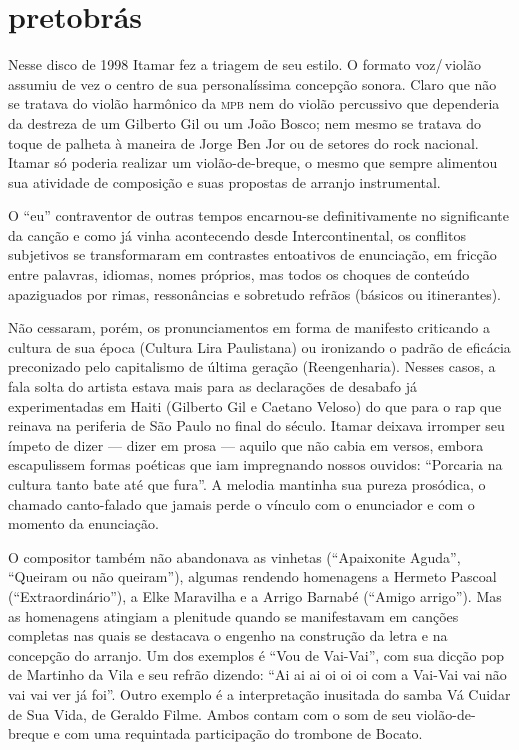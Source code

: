 \section{pretobrás}

Nesse disco de 1998 Itamar fez a triagem de seu estilo. O formato
voz/\,violão assumiu de vez o centro de sua personalíssima concepção
sonora. Claro que não se tratava do violão harmônico da \textsc{mpb} nem do
violão percussivo que dependeria da destreza de um Gilberto Gil ou um
João Bosco; nem mesmo se tratava do toque de palheta à maneira de Jorge
Ben Jor ou de setores do rock nacional. Itamar só poderia realizar um
violão-de-breque, o mesmo que sempre alimentou sua atividade de
composição e suas propostas de arranjo instrumental.

O ``eu'' contraventor de outras tempos encarnou-se definitivamente no
significante da canção e como já vinha acontecendo desde
Intercontinental, os conflitos subjetivos se transformaram em contrastes
entoativos de enunciação, em fricção entre palavras, idiomas, nomes
próprios, mas todos os choques de conteúdo apaziguados por rimas,
ressonâncias e sobretudo refrãos (básicos ou itinerantes).

Não cessaram, porém, os pronunciamentos em forma de manifesto criticando a cultura de sua época (Cultura Lira Paulistana) ou ironizando o
padrão de eficácia preconizado pelo capitalismo de última geração
(Reengenharia). Nesses casos, a fala solta do artista estava mais para
as declarações de desabafo já experimentadas em Haiti (Gilberto Gil e
Caetano Veloso) do que para o rap que reinava na periferia de São Paulo
no final do século. Itamar deixava irromper seu ímpeto de dizer ---
dizer em prosa --- aquilo que não cabia em versos, embora escapulissem
formas poéticas que iam impregnando nossos ouvidos: ``Porcaria na
cultura tanto bate até que fura''. A melodia mantinha sua pureza
prosódica, o chamado canto-falado que jamais perde o vínculo com o
enunciador e com o momento da enunciação.

O compositor também não abandonava as vinhetas (``Apaixonite Aguda'',
``Queiram ou não queiram''), algumas rendendo homenagens a Hermeto Pascoal
(``Extraordinário''), a Elke Maravilha e a Arrigo Barnabé (``Amigo arrigo'').
Mas as homenagens atingiam a plenitude quando se manifestavam em canções
completas nas quais se destacava o engenho na construção da letra e na
concepção do arranjo. Um dos exemplos é ``Vou de Vai-Vai'', com sua dicção
pop de Martinho da Vila e seu refrão dizendo: ``Ai ai ai oi oi oi com a
Vai-Vai vai não vai vai ver já foi''. Outro exemplo é a interpretação
inusitada do samba Vá Cuidar de Sua Vida, de Geraldo Filme. Ambos contam
com o som de seu violão-de-breque e com uma requintada participação do
trombone de Bocato.

